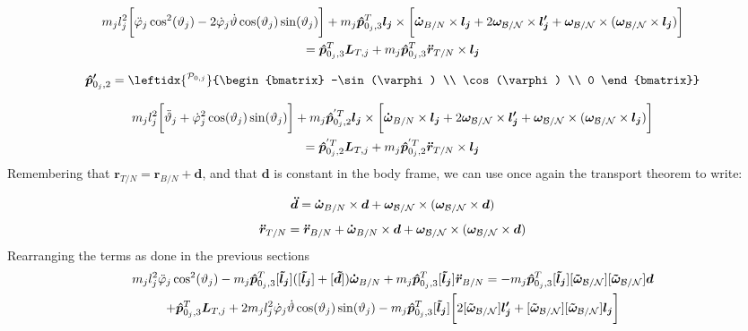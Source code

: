 \begin{multline}
	m_j l_j^2\bigg[\ddot{\varphi}_j\cos^2(\vartheta_j)-2\dot{\varphi}_j\dot{\vartheta}\cos(\vartheta_j)\sin(\vartheta_j)\bigg] + m_j \bm{\hat{p}}_{0_j,3}^T \bm{l_j}\times \bigg[\bm{\dot{\omega}}_{B/N}\times \bm{l_j} + 2\bm\omega_{\cal B/N}\times \bm{l_j'}+\bm\omega_{\cal B/N}\times(\bm\omega_{\cal B/N}\times \bm{l_j})\bigg]\\
	=\bm{\hat{p}}_{0_j,3}^T \bm{L}_{T,j}+m_{j} \bm{\hat{p}}_{0_j,3}^T \bm{\ddot{r}}_{T/N}\times \bm{l_j}
	\label{eq:FSE4}
\end{multline}

\begin{equation}
	\bm{\hat{p}'}_{0_j,2}=
	\leftidx{^{\mathcal{P}_{0,j}}}
	{\begin{bmatrix}
			-\sin(\varphi) \\ \cos(\varphi) \\ 0
	\end{bmatrix}}
\end{equation}

\begin{multline}
	m_j l_j^2\bigg[\ddot{\vartheta}_j+\dot{\varphi}_j^2\cos(\vartheta_j)\sin(\vartheta_j)\bigg] + m_j \bm{\hat{p}}_{0_j,2}^{'T} \bm{l_j}\times \bigg[\bm{\dot{\omega}}_{B/N}\times \bm{l_j} + 2\bm\omega_{\cal B/N}\times \bm{l_j'}+\bm\omega_{\cal B/N}\times(\bm\omega_{\cal B/N}\times \bm{l_j})\bigg]\\
	=\bm{\hat{p}}_{0_j,2}^{'T} \bm{L}_{T,j}+m_{j} \bm{\hat{p}}_{0_j,2}^{'T} \bm{\ddot{r}}_{T/N}\times \bm{l_j}
	\label{eq:FSE5}
\end{multline}
Remembering that $\bm{r}_{T/N} = \bm{r}_{B/N} + \bm{d}$, and that $\bm{d}$ is constant in the body frame, we can use once again the transport theorem to write:

\begin{equation}
	\bm{\ddot{d}}=\bm{\dot{\omega}}_{B/N}\times \bm{d}+\bm\omega_{\cal B/N}\times(\bm\omega_{\cal B/N}\times \bm{d})
\end{equation}
\begin{equation}
	\bm{\ddot{r}}_{T/N} = \bm{\ddot{r}}_{B/N} + \bm{\dot{\omega}}_{B/N}\times \bm{d}+\bm\omega_{\cal B/N}\times(\bm\omega_{\cal B/N}\times \bm{d})
\end{equation}
Rearranging the terms as done in the previous sections
\begin{multline}
	m_j l_j^2\ddot{\varphi}_j\cos^2(\vartheta_j) -m_{j} \bm{\hat{p}}_{0_j,3}^T [\bm{\tilde{l}_j}]([\bm{\tilde{l}_j}]+ [\bm{\tilde{d}}]) \bm{\dot{\omega}}_{B/N} +m_{j} \bm{\hat{p}}_{0_j,3}^{T} [\bm{\tilde{l}_j}] \bm{\ddot{r}}_{B/N} =-m_{j} \bm{\hat{p}}_{0_j,3}^{T} [\bm{\tilde{l}_j}][\bm{\tilde{\omega}}_{\cal B/N}][\bm{\tilde{\omega}}_{\cal B/N}] \bm{d}\\+\bm{\hat{p}}_{0_j,3}^T \bm{L}_{T,j}+2m_j l_j^2\dot{\varphi}_j\dot{\vartheta}\cos(\vartheta_j)\sin(\vartheta_j)- m_j \bm{\hat{p}}_{0_j,3}^T [\bm{\tilde{l}_j}]\bigg[2[\bm{\tilde{\omega}}_{\cal B/N}] \bm{l_j'}+[\bm{\tilde{\omega}}_{\cal B/N}][\bm{\tilde{\omega}}_{\cal B/N}] \bm{l_j}\bigg]
	\label{eq:FSE6}
\end{multline}

